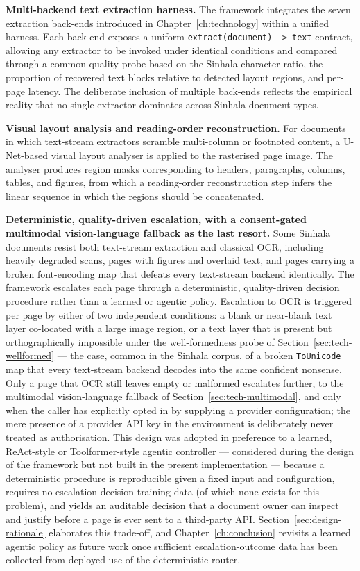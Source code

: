 \documentclass[12pt,a4paper,oneside]{report}
\begin{document}
\textbf{Multi-backend text extraction harness.} The framework integrates the seven extraction back-ends introduced in Chapter~\ref{ch:technology} within a unified harness. Each back-end exposes a uniform \texttt{extract(document) -> text} contract, allowing any extractor to be invoked under identical conditions and compared through a common quality probe based on the Sinhala-character ratio, the proportion of recovered text blocks relative to detected layout regions, and per-page latency. The deliberate inclusion of multiple back-ends reflects the empirical reality that no single extractor dominates across Sinhala document types.

\textbf{Visual layout analysis and reading-order reconstruction.} For documents in which text-stream extractors scramble multi-column or footnoted content, a U-Net-based visual layout analyser \cite{ronneberger2015unet, wickramasinghe2024unet} is applied to the rasterised page image. The analyser produces region masks corresponding to headers, paragraphs, columns, tables, and figures, from which a reading-order reconstruction step infers the linear sequence in which the regions should be concatenated.

\textbf{Deterministic, quality-driven escalation, with a consent-gated multimodal vision-language fallback as the last resort.}
\label{sec:approach-multimodal-agentic}
Some Sinhala documents resist both text-stream extraction and classical OCR, including heavily degraded scans, pages with figures and overlaid text, and pages carrying a broken font-encoding map that defeats every text-stream backend identically. The framework escalates each page through a deterministic, quality-driven decision procedure rather than a learned or agentic policy. Escalation to OCR is triggered per page by either of two independent conditions: a blank or near-blank text layer co-located with a large image region, or a text layer that is present but orthographically impossible under the well-formedness probe of Section~\ref{sec:tech-wellformed} — the case, common in the Sinhala corpus, of a broken \texttt{ToUnicode} map that every text-stream backend decodes into the same confident nonsense. Only a page that OCR still leaves empty or malformed escalates further, to the multimodal vision-language fallback of Section~\ref{sec:tech-multimodal}, and only when the caller has explicitly opted in by supplying a provider configuration; the mere presence of a provider API key in the environment is deliberately never treated as authorisation. This design was adopted in preference to a learned, ReAct-style \cite{yao2023react} or Toolformer-style \cite{schick2023toolformer} agentic controller — considered during the design of the framework but not built in the present implementation — because a deterministic procedure is reproducible given a fixed input and configuration, requires no escalation-decision training data (of which none exists for this problem), and yields an auditable decision that a document owner can inspect and justify before a page is ever sent to a third-party API. Section~\ref{sec:design-rationale} elaborates this trade-off, and Chapter~\ref{ch:conclusion} revisits a learned agentic policy as future work once sufficient escalation-outcome data has been collected from deployed use of the deterministic router.
\end{document}
